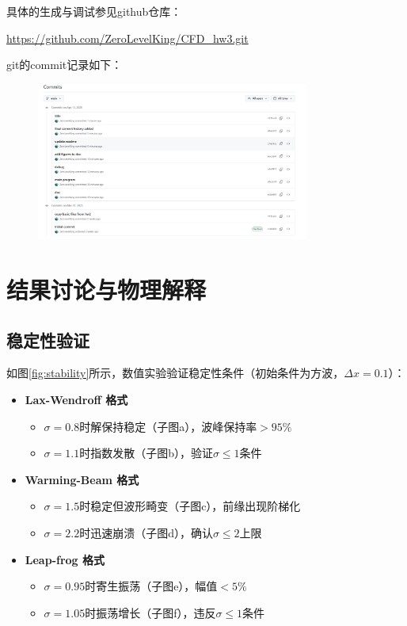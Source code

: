 \documentclass[UTF8]{ctexart}
\begin{document}
具体的生成与调试参见github仓库：
\begin{center}
    \url{https://github.com/ZeroLevelKing/CFD_hw3.git}
\end{center}
git的commit记录如下：

\begin{figure}[H]
    \centering
    \includegraphics[width=0.8\textwidth]{c1.png} 
\end{figure}


\section{结果讨论与物理解释}

\subsection{稳定性验证}
如图\ref{fig:stability}所示，数值实验验证稳定性条件（初始条件为方波，$\Delta x=0.1$）：

\begin{itemize}
    \item \textbf{Lax-Wendroff 格式}
    \begin{itemize}
        \item $\sigma=0.8$时解保持稳定（子图a），波峰保持率$>95\%$
        \item $\sigma=1.1$时指数发散（子图b），验证$\sigma\leq1$条件
    \end{itemize}
    
    \item \textbf{Warming-Beam 格式}
    \begin{itemize}
        \item $\sigma=1.5$时稳定但波形畸变（子图c），前缘出现阶梯化
        \item $\sigma=2.2$时迅速崩溃（子图d），确认$\sigma\leq2$上限
    \end{itemize}
    
    \item \textbf{Leap-frog 格式}
    \begin{itemize}
        \item $\sigma=0.95$时寄生振荡（子图e），幅值$<5\%$
        \item $\sigma=1.05$时振荡增长（子图f），违反$\sigma\leq1$条件
    \end{itemize}
\end{itemize}
\end{document}
